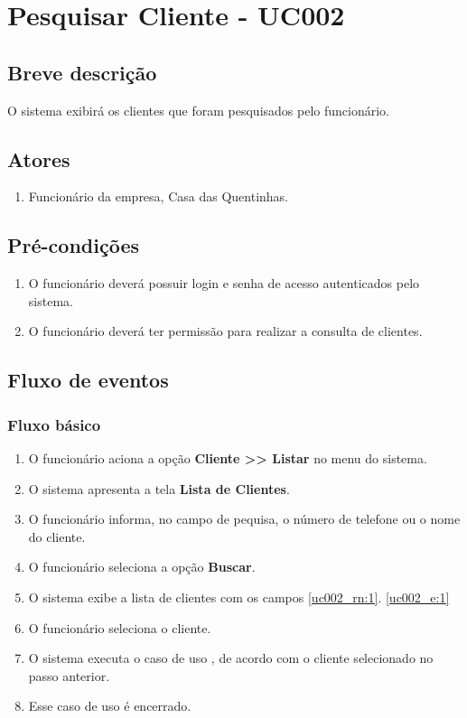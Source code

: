 \chapter{Pesquisar Cliente - UC002} \label{uc002}

\section{Breve descrição}

O sistema exibirá os clientes que foram pesquisados pelo funcionário.

\section{Atores}

\begin{enumerate}
	\item Funcionário da empresa, Casa das Quentinhas.
\end{enumerate}

\section{Pré-condições}

\begin{enumerate}
	\item O funcionário deverá possuir login e senha de acesso autenticados pelo sistema.
	\item O funcionário deverá ter permissão para realizar a consulta de clientes.
\end{enumerate}

\section{Fluxo de eventos}

\subsection{Fluxo básico}

\begin{enumerate}[label=P\arabic*]
	\item O funcionário aciona a opção \textbf{Cliente >> Listar} no menu do sistema.
	\item O sistema apresenta a tela \textbf{Lista de Clientes}.	
	\item O funcionário informa, no campo de pequisa, o número de telefone ou o nome do cliente. \label{uc002_p:3}
	\item O funcionário seleciona a opção \textbf{Buscar}. \label{uc002_p:4}
	\item O sistema exibe a lista de clientes com os campos \ref{uc002_rn:1}. \ref{uc002_e:1}
	\item O funcionário seleciona o cliente.
	\item O sistema executa o caso de uso , de acordo com o cliente selecionado no passo anterior.
	\item Esse caso de uso é encerrado.
\end{enumerate}

